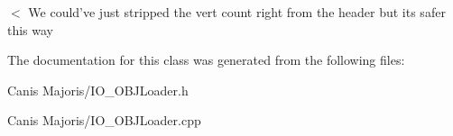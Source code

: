 $<$ We could've just stripped the vert count right from the header but its safer this way 

The documentation for this class was generated from the following files\+:\begin{DoxyCompactItemize}
\item 
Canis Majoris/I\+O\+\_\+\+O\+B\+J\+Loader.\+h\item 
Canis Majoris/I\+O\+\_\+\+O\+B\+J\+Loader.\+cpp\end{DoxyCompactItemize}

